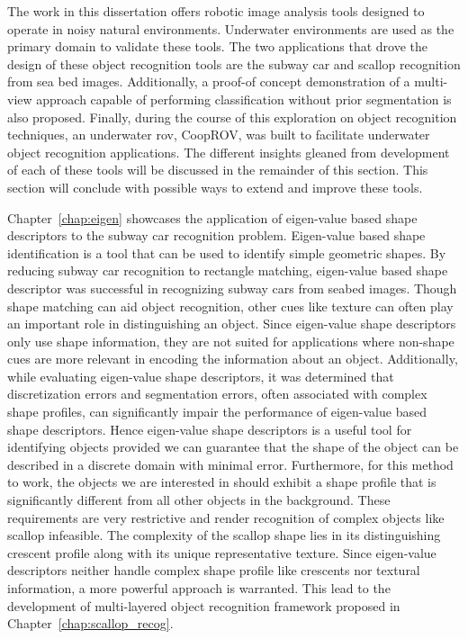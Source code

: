 \documentclass {udthesis}
\begin{document}

The work in this dissertation offers robotic image analysis tools designed to operate in noisy natural environments. 
Underwater environments are used as the primary domain to validate these tools.
The two applications that drove the design of these object recognition tools are the subway car and scallop recognition from sea bed images.
Additionally, a proof-of concept demonstration of a multi-view approach capable of performing classification without prior segmentation is also proposed.
Finally, during the course of this exploration on object recognition techniques, an underwater \gls{rov}, CoopROV, was built to facilitate underwater object recognition applications. The different insights gleaned from development of each of these tools will be discussed in the remainder of this section. This section will conclude with possible ways to extend and improve these tools.

Chapter~\ref{chap:eigen} showcases the application of eigen-value based shape descriptors to the subway car recognition problem. 
Eigen-value based shape identification is a tool that can be used to identify simple geometric shapes. 
By reducing subway car recognition to rectangle matching, eigen-value based shape descriptor was
successful in recognizing subway cars from seabed images.
Though shape matching can aid object recognition, other cues like texture can often play an important role
in distinguishing an object. Since eigen-value shape descriptors only use shape information, 
they are not suited for applications where non-shape cues are more relevant in encoding the information about an object. 
Additionally, while evaluating eigen-value shape descriptors, it was determined that 
discretization errors and segmentation errors, often associated with
complex shape profiles, can significantly impair the performance of eigen-value based shape descriptors.
Hence eigen-value shape descriptors is a useful tool for identifying
objects provided we can guarantee that the shape of the object can be described in a
discrete domain with minimal error. Furthermore, for this method to work, the objects
we are interested in should exhibit a shape profile that is significantly different from
all other objects in the background. These requirements are very restrictive and render recognition of complex objects like scallop infeasible. 
The complexity of the scallop shape lies in its distinguishing crescent profile along with its unique representative texture.
Since eigen-value descriptors neither handle complex shape profile like crescents nor textural information,
a more powerful approach is warranted.
This lead to the development of multi-layered object recognition framework proposed in Chapter~\ref{chap:scallop_recog}.
\end{document}
